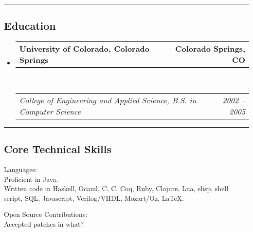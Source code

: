 \documentclass[10pt,letterpaper]{article}
\makeatletter
\newenvironment{indentsection}[1]%
{\begin{list}{}%
	{\setlength{\leftmargin}{#1}}%
	\item[]%
}
{\end{list}}
\newcommand{\headerrow}[2]
{\begin{tabular*}{\linewidth}{l@{\extracolsep{\fill}}r}
	#1 &
	#2 \\
\end{tabular*}}
\newcommand{\CPP}
{C\nolinebreak[4]\hspace{-.05em}\raisebox{.22ex}{\footnotesize\bf ++}}
\makeatother
\begin{document}
\hrule
\vspace{-0.4em}
\subsection*{Education}

\begin{itemize}
	\parskip=0.1em

	\item
	\headerrow
		{\textbf{University of Colorado, Colorado Springs}}
		{\textbf{Colorado Springs, CO}}
	\\
	\headerrow
		{\emph{College of Engineering and Applied Science, B.S. in Computer Science}}
		{\emph{2002 -- 2005}}

\end{itemize}


\hrule
\vspace{-0.4em}
\subsection*{Core Technical Skills}

\begin{indentsection}{\parindent}
\begin{description*}
	\item[Languages:] \ \\
	Proficient in Java. \\
	Written code in Haskell, Ocaml, C, \CPP, Coq, Ruby, Clojure, Lua, elisp, shell script, SQL, Javascript, Verilog/VHDL, Mozart/Oz, \LaTeX.
	\item[Open Source Contributions:] \ \\
	Accepted patches in what?
\end{description*}
\end{indentsection}
\end{document}
